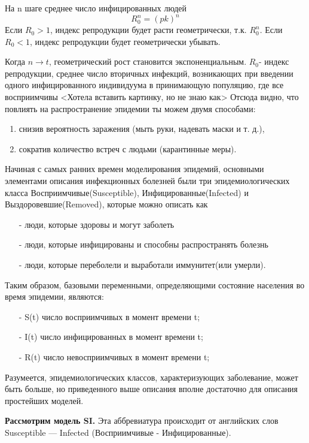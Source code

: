 На n шаге среднее число инфицированных людей
\begin{equation}
R_0^n= (pk)^n
\end{equation}
Если $R_0 > 1$, индекс репродукции будет расти геометрически, т.к. $R_0^n$.\skip
Если $R_0 < 1$, индекс репродукции будет геометрически убывать.

Когда $ n \rightarrow t $, геометрический рост становится экспоненциальным.
$R_0$- индекс репродукции, среднее число вторичных инфекций, возникающих при введении одного инфицированного индивидуума в принимающую популяцию, где все восприимчивы
<Хотела вставить картинку, но не знаю как>
Отсюда видно, что повлиять на распространение эпидемии ты можем двумя способами:
\begin{enumerate}
\item снизив вероятность заражения (мыть руки, надевать маски и т. д.),
\item сократив количество встреч с людьми (карантинные меры).
\end{enumerate}

Начиная с самых ранних времен моделирования эпидемий, основными элементами описания инфекционных болезней были три эпидемиологических класса Восприимчивые(Susceptible), Инфицированные(Infected) и Выздоровевшие(Removed), которые можно описать как
\begin{itemize}
\item[-] люди, которые здоровы и могут заболеть
\item[-] люди, которые инфицированы и способны распространять болезнь
\item[-] люди, которые переболели и выработали иммунитет(или умерли).
\end{itemize}

Таким образом, базовыми переменными, определяющими состояние населения во время эпидемии, являются:
\begin{itemize}
\item[-] S(t) число восприимчивых в момент времени t;
\item[-] I(t) число инфицированных в момент времени t;
\item[-] R(t) число невосприимчивых в момент времени t;
\end{itemize}

Разумеется, эпидемиологических классов, характеризующих заболевание, может быть больше, но приведенного выше описания вполне достаточно для описания простейших моделей.


\textbf{Рассмотрим модель SI.} Эта аббревиатура происходит от английских слов Susceptible — Infected (Восприимчивые - Инфицированные).

